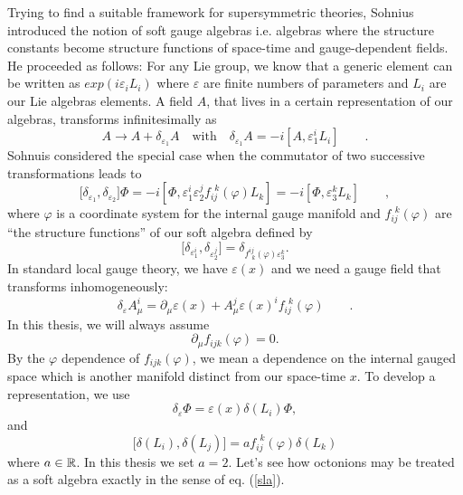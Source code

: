 \documentclass[a4paper,12pt]{book}
\begin{document}
Trying to find a suitable framework for supersymmetric theories, Sohnius
introduced the notion of soft gauge algebras i.e. algebras where the
structure constants become structure functions of space-time and
gauge-dependent fields. He proceeded as follows: For any Lie group, we know
that a generic element can be written as $exp(i\varepsilon _{i}L_{i})$ where 
$\varepsilon $ are finite numbers of parameters and $L_{i}$ are our Lie
algebras elements. A field $A$, that lives in a certain representation of
our algebras, transforms infinitesimally as 
\begin{equation}
A\longrightarrow A+\delta _{\varepsilon _{1}}A\quad \mbox{with}\quad \delta
_{\varepsilon _{1}}A=-i[A,\varepsilon _{1}^{i}L_{i}]\qquad .
\end{equation}
Sohnuis considered the special case when the commutator of two successive
transformations leads to 
\begin{equation}
\lbrack \delta _{\varepsilon _{1}},\delta _{\varepsilon _{2}}]\Phi =-i[\Phi
,\varepsilon _{1}^{i}\varepsilon _{2}^{j}f_{ij}^{\ \ k}(\varphi
)L_{k}]=-i\left[ \Phi ,\varepsilon _{3}^{k}L_{k}\right] \qquad ,
\end{equation}
where $\varphi $ is a coordinate system for the internal gauge manifold and $%
f_{ij}^{\ \ k}(\varphi )$ are ``the structure functions'' of our soft
algebra defined by 
\begin{equation}
\lbrack \delta _{\varepsilon _{1}^{i}},\delta _{\varepsilon
_{2}^{j}}]=\delta _{f_{\ \ k}^{ij}(\varphi )\varepsilon _{3}^{k}}.
\end{equation}
In standard local gauge theory, we have $\varepsilon (x)$ and we need a
gauge field that transforms inhomogeneously: 
\begin{equation}
\delta _{\varepsilon }A_{\mu }^{i}=\partial _{\mu }\varepsilon (x)+A_{\mu
}^{j}\varepsilon (x)^{i}f_{ij}^{\ \ k}(\varphi )\qquad .
\end{equation}
In this thesis, we will always assume 
\begin{equation}
\partial _{\mu }f_{ijk}(\varphi )=0.
\end{equation}
By the $\varphi $ dependence of $f_{ijk}(\varphi )$, we mean a dependence on
the internal gauged space which is another manifold distinct from our
space-time $x$. To develop a representation, we use 
\begin{equation}
\delta _{\varepsilon }\Phi =\varepsilon (x)\delta (L_{i})\Phi ,
\end{equation}
and 
\begin{equation}
\lbrack \delta (L_{i}),\delta (L_{j})]=af_{ij}^{\ \ k}(\varphi )\delta
(L_{k})  \label{sla}
\end{equation}
where $a\in \Bbb{R}$. In this thesis we set $a=2$. Let's see how octonions
may be treated as a soft algebra exactly in the sense of eq. (\ref{sla}).
\end{document}
